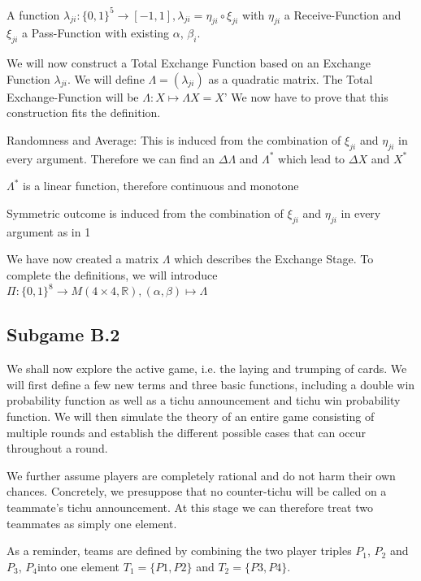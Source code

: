 \begin{definition}
A function $\lambda_{ji}: \{0,1\}^5 \to [-1,1], \lambda_{ji} = \eta_{ji} \circ \xi_{ji}$ with $\eta_{ji}$ a Receive-Function and $\xi_{ji}$ a Pass-Function with existing $\alpha$, $\beta_i$.
\end{definition}
\begin{remark}[Construction]
We will now construct a Total Exchange Function based on an Exchange Function $\lambda_{ji}$. We will define $\Lambda = (\lambda_{ji})$ as a quadratic matrix. 
The Total Exchange-Function will be $\Lambda: X \mapsto \Lambda X = X’$
We now have to prove that this construction fits the definition.
\begin{axioms}[(1)]
\item Randomness and Average: This is induced from the combination of $\xi_{ji}$ and $\eta_{ji}$ in every argument. Therefore we can find an $\Delta \Lambda$ and $\Lambda^* $ which lead to $\Delta X $ and 
$X^*$
\item $\Lambda^*$ is a linear function, therefore continuous and monotone
\item Symmetric outcome is induced from the combination of $\xi_{ji}$ and $\eta_{ji}$ in every argument as in 1
\end{axioms}
We have now created a matrix $\Lambda$ which describes the Exchange Stage. To complete the definitions, we will introduce $ \Pi : \{0,1\}^8 \to M(4 \times 4, \mathbb{R}), (\alpha, \beta) \mapsto \Lambda $
\end{remark}

\subsection{Subgame B.2}
We shall now explore the active game, i.e. the laying and trumping of cards. We will first define a few new terms and three basic functions, including a double win probability function as well as a tichu announcement and tichu win probability function. We will then simulate the theory of an entire game consisting of multiple rounds and establish the different possible cases that can occur throughout a round.

We further assume players are completely rational and do not harm their own chances. Concretely, we presuppose that no counter-tichu will be called on a teammate’s tichu announcement. At this stage we can therefore treat two teammates as simply one element.

As a reminder, teams are defined by combining the two player triples $P_1$, $P_2$ and $P_3$, $P_4$into one element $T_1 = \{P1,P2\}$ and $T_2 = \{P3,P4\}$.

